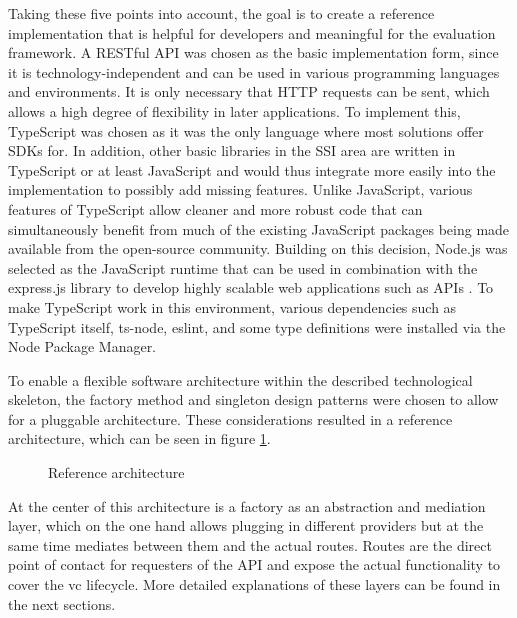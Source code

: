     Taking these five points into account, the goal is to create a reference implementation that is helpful for developers and meaningful for the evaluation framework. A RESTful API was chosen as the basic implementation form, since it is technology-independent and can be used in various programming languages and environments. It is only necessary that HTTP requests can be sent, which allows a high degree of flexibility in later applications. To implement this, TypeScript was chosen as it was the only language where most solutions offer SDKs for. In addition, other basic libraries in the \ac{SSI} area are written in TypeScript or at least JavaScript and would thus integrate more easily into the implementation to possibly add missing features. Unlike JavaScript, various features of TypeScript allow cleaner and more robust code \cite[p. 87]{zammetti_modern_2020} that can simultaneously benefit from much of the existing JavaScript packages being made available from the open-source community. Building on this decision, Node.js was selected as the JavaScript runtime that can be used in combination with the express.js library to develop highly scalable web applications such as APIs \cite{openjs_foundation_about_2021, openjs_foundation_express_2021}. To make TypeScript work in this environment, various dependencies such as TypeScript itself, ts-node, eslint, and some type definitions were installed via the Node Package Manager.
    
    To enable a flexible software architecture within the described technological skeleton, the factory method and singleton design patterns were chosen to allow for a pluggable architecture. These considerations resulted in a reference architecture, which can be seen in figure \ref{figure: ref arch}.
    
    \begin{figure}[ht]
	    \centering    	    
	    \makebox[\textwidth]{}
        \caption{Reference architecture}
        \label{figure: ref arch}
    \end{figure}
    
    At the center of this architecture is a factory as an abstraction and mediation layer, which on the one hand allows plugging in different providers but at the same time mediates between them and the actual routes. Routes are the direct point of contact for requesters of the API and expose the actual functionality to cover the \ac{vc} lifecycle. More detailed explanations of these layers can be found in the next sections.

